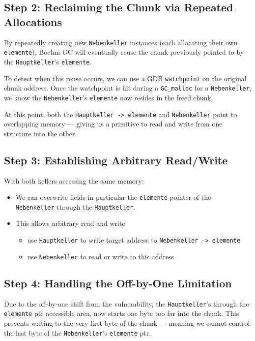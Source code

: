 \documentclass[a4paper,11pt]{article}
\begin{document}
\subsection*{Step 2: Reclaiming the Chunk via Repeated Allocations}

By repeatedly creating new \texttt{Nebenkeller} instances (each allocating their own \texttt{elemente}), Boehm GC will eventually reuse the chunk previously pointed to by the \texttt{Hauptkeller}'s \texttt{elemente}.

To detect when this reuse occurs, we can use a GDB \texttt{watchpoint} on the original chunk address. Once the watchpoint is hit during a \texttt{GC\_malloc} for a \texttt{Nebenkeller}, we know the \texttt{Nebenkeller}'s \texttt{elemente} now resides in the freed chunk.

At this point, both the \texttt{Hauptkeller -> elemente} and \texttt{Nebenkeller} point to overlapping memory — giving us a primitive to read and write from one structure into the other.

\subsection*{Step 3: Establishing Arbitrary Read/Write}

With both kellers accessing the same memory:
\begin{itemize}
    \item We can overwrite fields in particular the \texttt{elemente} pointer of the \texttt{Nebenkeller} through the \texttt{Hauptkeller}.
    \item This allows arbitrary read and write
    \begin{itemize}
        \item use \texttt{Hauptkeller} to write target address to \texttt{Nebenkeller -> elemente}
        \item use \texttt{Nebenkeller} to read or write to this address
    \end{itemize}
\end{itemize}

\subsection*{Step 4: Handling the Off-by-One Limitation}

Due to the off-by-one shift from the vulnerability, the \texttt{Hauptkeller}'s through the \texttt{elemente} ptr accessible area, now starts one byte too far into the chunk. This prevents writing to the very first byte of the chunk — meaning we cannot control the last byte of the \texttt{Nebenkeller}'s \texttt{elemente} ptr.
\end{document}
